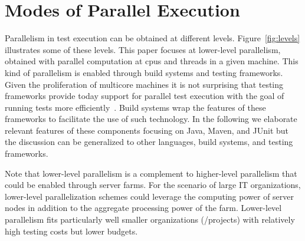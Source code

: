 \section{Modes of Parallel Execution}


Parallelism in test execution can be obtained at different levels.
Figure~\ref{fig:levels} illustrates some of these levels.  This paper
focuses at lower-level parallelism, obtained with parallel computation
at cpus and threads in a given machine.  This kind of parallelism is
enabled through build systems and testing frameworks.  Given the
proliferation of multicore machines it is not surprising that testing
frameworks provide today support for parallel test execution with the
goal of running tests more efficiently~\cite{junit-org,testng,nunit}.
Build systems wrap the features of these frameworks to facilitate the
use of such technology\cite{maven-surefire-plugin}.  In the following
we elaborate relevant features of these components focusing on Java,
Maven, and JUnit but the discussion can be generalized to other
languages, build systems, and testing frameworks.

Note that lower-level parallelism is a complement to higher-level
parallelism that could be enabled through server farms.  For the
scenario of large IT organizations, lower-level parallelization
schemes could leverage the computing power of server nodes in addition
to the aggregate processing power of the farm.  Lower-level
parallelism fits particularly well smaller organizations (/projects)
with relatively high testing costs but lower budgets.


